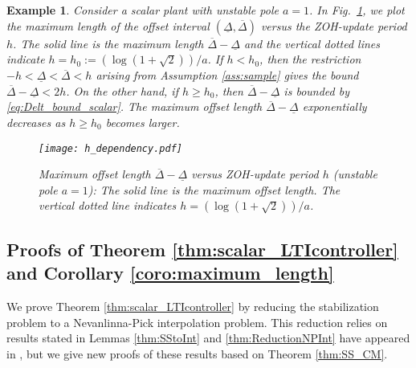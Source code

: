 \documentclass[letterpaper, 12pt, draftcls, onecolumn]{ieeeconf}
\newtheorem{example}[theorem]{Example}
\begin{document}
\begin{example}
	Consider a scalar plant with unstable pole $a = 1$. 
	In Fig.~\ref{fig:h_dependency}, 
	we plot the maximum length of the offset interval $(
	\underline \Delta, \overline \Delta)$
	versus the ZOH-update period $h$. 
	The solid line is the maximum length $\overline \Delta - \underline \Delta$
	and 
	the vertical dotted lines indicate $h = h_0 := (\log(1+\sqrt{2}))/a$.
	If $h < h_0$, then the restriction $-h < \underline \Delta < \overline \Delta
	< h$ arising from Assumption \ref{ass:sample} gives the bound
	$\overline \Delta - \underline \Delta < 2h$.
	On the other hand, if $h \geq h_0$, then
	$\overline \Delta - \underline \Delta$ is bounded by \eqref{eq:Delt_bound_scalar}.
	The maximum offset length $\overline \Delta - \underline \Delta$
	exponentially decreases as $h \geq h_0$ becomes larger. 
	\begin{figure}[bt]
		\centering
		\texttt{[image: h\_dependency.pdf]}
		\caption{Maximum offset length $\overline \Delta - 
			\underline \Delta$ 
			versus ZOH-update period $h$ (unstable pole $a=1$):
			The solid line is 
			the maximum offset length. The vertical dotted line
			indicates $h= (\log(1+\sqrt{2}))/a$.}
		\label{fig:h_dependency}
	\end{figure}
\end{example}

\subsection{Proofs of Theorem \ref{thm:scalar_LTIcontroller}
	and Corollary \ref{coro:maximum_length}}
We prove Theorem \ref{thm:scalar_LTIcontroller}
by reducing the stabilization problem 
to a
Nevanlinna-Pick interpolation problem.
This reduction relies on results stated in 
Lemmas \ref{thm:SStoInt} and \ref{thm:ReductionNPInt}
have appeared in \cite{Ghosh1988, Olbrot1994}, 
but we give new proofs of these results 
based on Theorem \ref{thm:SS_CM}.
\end{document}
